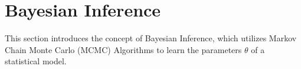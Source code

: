 \section{Bayesian Inference}
This section introduces the concept of Bayesian Inference, which utilizes Markov Chain Monte Carlo (MCMC) Algorithms to learn the parameters $\theta$ of a statistical model.
